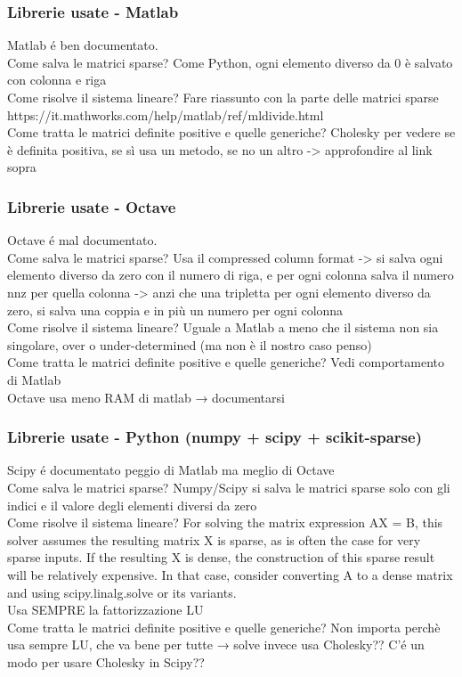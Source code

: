 \documentclass{beamer}
\begin{document}

\frametitle{Librerie usate - Matlab}
\begin{frame}
Matlab \'e ben documentato.\\
Come salva le matrici sparse? Come Python, ogni elemento diverso da 0 è salvato con colonna e riga\\
Come risolve il sistema lineare? Fare riassunto con la parte delle matrici sparse https://it.mathworks.com/help/matlab/ref/mldivide.html\\
Come tratta le matrici definite positive e quelle generiche? Cholesky per vedere se è definita positiva, se sì usa un metodo, se no un altro -> approfondire al link sopra
\end{frame}

\begin{frame}
\frametitle{Librerie usate - Octave}
Octave \'e mal documentato. \\
Come salva le matrici sparse? Usa il compressed column format -> si salva ogni elemento diverso da zero con il numero di riga, e per ogni colonna salva il numero nnz per quella colonna -> anzi che una tripletta per ogni elemento diverso da zero, si salva una coppia e in più un numero per ogni colonna\\
Come risolve il sistema lineare? Uguale a Matlab a meno che il sistema non sia singolare, over o under-determined (ma non è il nostro caso penso)\\
Come tratta le matrici definite positive e quelle generiche? Vedi comportamento di Matlab\\

Octave usa meno RAM di matlab → documentarsi
\end{frame}

\begin{frame}
\frametitle{Librerie usate - Python (numpy + scipy + scikit-sparse)}
Scipy \'e documentato peggio di Matlab ma meglio di Octave \\
Come salva le matrici sparse? Numpy/Scipy si salva le matrici sparse solo con gli indici e il valore degli elementi diversi da zero\\
Come risolve il sistema lineare?
For solving the matrix expression AX = B, this solver assumes the resulting matrix X is sparse, as is often the case for very sparse inputs. If the resulting X is dense, the construction of this sparse result will be relatively expensive. In that case, consider converting A to a dense matrix and using scipy.linalg.solve or its variants.\\
Usa SEMPRE la fattorizzazione LU\\
Come tratta le matrici definite positive e quelle generiche? Non importa perchè usa sempre LU, che va bene per tutte → solve invece usa Cholesky?? C’\'e un modo per usare Cholesky in Scipy??
\end{frame}
\end{document}
